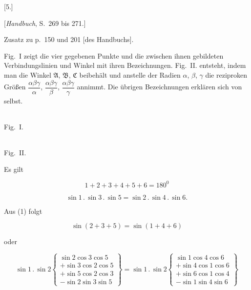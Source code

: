 
\begin{center}
[5.]

[\emph{Handbuch}, S.\ 269 bis 271.]
\end{center}

\begin{center}Zusatz zu p.\ 150 und 201 [des Handbuchs].\end{center}

Fig.\ I zeigt die vier gegebenen Punkte und die zwischen ihnen gebildeten Verbindungslinien und Winkel mit ihren Bezeichnungen. Fig.\ II. entsteht, indem man die Winkel $\mathfrak{A}$, $\mathfrak{B}$, $\mathfrak{C}$ beibehält und anstelle der Radien $\alpha$, $\beta$, $\gamma$ die reziproken Größen $\dfrac{\alpha\beta\gamma}{\alpha}$, $\dfrac{\alpha\beta\gamma}{\beta}$, $\dfrac{\alpha\beta\gamma}{\gamma}$ annimmt. Die übrigen Bezeichnungen erklären sich von selbst.

\begin{center}
\begin{minipage}[b]{5.5cm}\centering\\Fig.\ I.\end{minipage}\hspace{.3cm}%
\begin{minipage}[b]{6.6cm}\centering\\Fig.\ II.\end{minipage}
\end{center}

Es gilt

\begin{equation}
1+2+3+4+5+6=180^0
\tag{1}
\end{equation}

\begin{equation}
\sin 1 \, . \, \sin 3 \, . \, \sin 5 = \sin 2 \, . \, \sin 4 \, . \, \sin 6.
\tag{2}
\end{equation}

Aus (1) folgt

\[
\sin(2+3+5) = \sin(1+4+6)
\]

oder

\[
\sin 1 \, . \, \sin 2 \left\{\begin{array}{l} \sin 2 \cos 3 \cos 5 \\ + \sin 3 \cos 2 \cos 5 \\ + \sin 5 \cos 2 \cos 3 \\ - \sin 2 \sin 3 \sin 5 \end{array}\right\}
= \sin 1 \, . \, \sin 2 \left\{\begin{array}{l} \sin 1 \cos 4 \cos 6 \\ + \sin 4 \cos 1 \cos 6 \\ + \sin 6 \cos 1 \cos 4 \\ - \sin 1 \sin 4 \sin 6 \end{array}\right\}
\]

